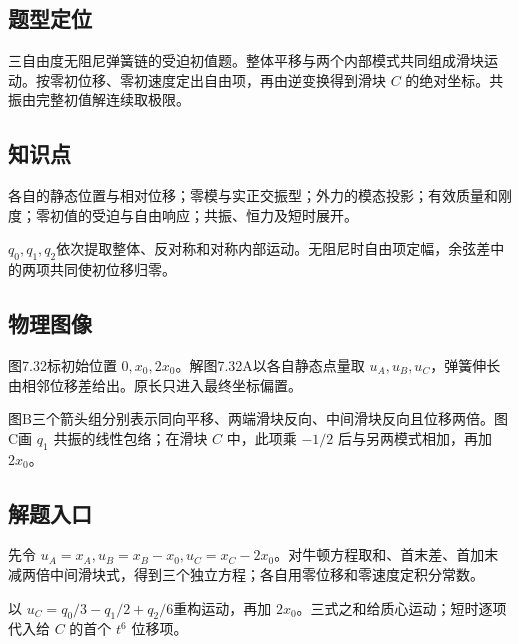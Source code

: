 \documentclass[UTF8,fontset=fandol,a4paper,11pt]{ctexart}
\begin{document}


\subsection*{题型定位}

三自由度无阻尼弹簧链的受迫初值题。整体平移与两个内部模式共同组成滑块运动。按零初位移、零初速度定出自由项，再由逆变换得到滑块 $C$ 的绝对坐标。共振由完整初值解连续取极限。



\subsection*{知识点}

各自的静态位置与相对位移；零模与实正交振型；外力的模态投影；有效质量和刚度；零初值的受迫与自由响应；共振、恒力及短时展开。

$q_0,q_1,q_2$依次提取整体、反对称和对称内部运动。无阻尼时自由项定幅，余弦差中的两项共同使初位移归零。




\subsection*{物理图像}

图7.32标初始位置 $0,x_0,2x_0$。解图7.32A以各自静态点量取 $u_A,u_B,u_C$，弹簧伸长由相邻位移差给出。原长只进入最终坐标偏置。

图B三个箭头组分别表示同向平移、两端滑块反向、中间滑块反向且位移两倍。图C画 $q_1$ 共振的线性包络；在滑块 $C$ 中，此项乘 $-1/2$ 后与另两模式相加，再加 $2x_0$。




\subsection*{解题入口}

先令 $u_A=x_A,u_B=x_B-x_0,u_C=x_C-2x_0$。对牛顿方程取和、首末差、首加末减两倍中间滑块式，得到三个独立方程；各自用零位移和零速度定积分常数。

以 $u_C=q_0/3-q_1/2+q_2/6$重构运动，再加 $2x_0$。三式之和给质心运动；短时逐项代入给 $C$ 的首个 $t^6$ 位移项。
\end{document}
